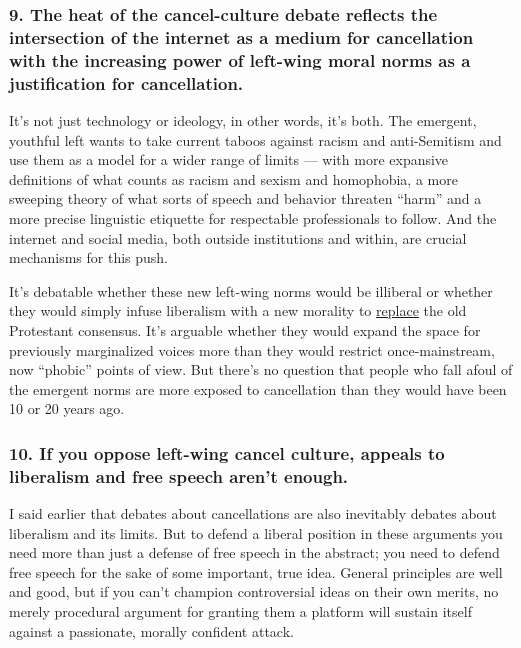 \hypertarget{9-the-heat-of-the-cancel-culture-debate-reflects-the-intersection-of-the-internet-as-a-medium-for-cancellation-with-the-increasing-power-of-left-wing-moral-norms-as-a-justification-for-cancellation}{%
\subsubsection{9. The heat of the cancel-culture debate reflects the
intersection of the internet as a medium for cancellation with the
increasing power of left-wing moral norms as a justification for
cancellation.}\label{9-the-heat-of-the-cancel-culture-debate-reflects-the-intersection-of-the-internet-as-a-medium-for-cancellation-with-the-increasing-power-of-left-wing-moral-norms-as-a-justification-for-cancellation}}

It's not just technology or ideology, in other words, it's both. The
emergent, youthful left wants to take current taboos against racism and
anti-Semitism and use them as a model for a wider range of limits ---
with more expansive definitions of what counts as racism and sexism and
homophobia, a more sweeping theory of what sorts of speech and behavior
threaten ``harm'' and a more precise linguistic etiquette for
respectable professionals to follow. And the internet and social media,
both outside institutions and within, are crucial mechanisms for this
push.

It's debatable whether these new left-wing norms would be illiberal or
whether they would simply infuse liberalism with a new morality to
\href{https://www.nytimes.com/2020/07/07/opinion/protestant-progressive-reformation.html}{replace}
the old Protestant consensus. It's arguable whether they would expand
the space for previously marginalized voices more than they would
restrict once-mainstream, now ``phobic'' points of view. But there's no
question that people who fall afoul of the emergent norms are more
exposed to cancellation than they would have been 10 or 20 years ago.

\hypertarget{10-if-you-oppose-left-wing-cancel-culture-appeals-to-liberalism-and-free-speech-arent-enough}{%
\subsubsection{10. If you oppose left-wing cancel culture, appeals to
liberalism and free speech aren't
enough.}\label{10-if-you-oppose-left-wing-cancel-culture-appeals-to-liberalism-and-free-speech-arent-enough}}

I said earlier that debates about cancellations are also inevitably
debates about liberalism and its limits. But to defend a liberal
position in these arguments you need more than just a defense of free
speech in the abstract; you need to defend free speech for the sake of
some important, true idea. General principles are well and good, but if
you can't champion controversial ideas on their own merits, no merely
procedural argument for granting them a platform will sustain itself
against a passionate, morally confident attack.


